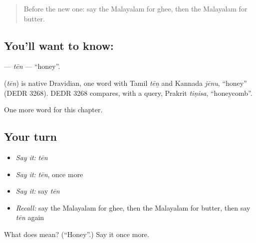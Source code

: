 \label{lesson:ML-C208-ten}



\begin{quote}
Before the new one: say the Malayalam for ghee, then the Malayalam for butter.
\end{quote}

\subsection*{You'll want to know: }
\textbf{} — \emph{tēn} — \textquotedblleft{}honey\textquotedblright{}.

\begin{cousinweb}
\textbf{} (\emph{tēn}) is native Dravidian, one word with Tamil \emph{tēṉ} and Kannada \emph{jēnu}, \textquotedblleft{}honey\textquotedblright{} (DEDR 3268). DEDR 3268 compares, with a query, Prakrit \emph{tiṇisa}, \textquotedblleft{}honeycomb\textquotedblright{}.
\end{cousinweb}

\begin{grammarlens}[title={What you've built}]
One more word for this chapter.
\end{grammarlens}

\subsection*{Your turn}
\begin{itemize}
\raggedright
  \item \emph{Say it:} \emph{tēn}
  \item \emph{Say it:} \emph{tēn}, once more
  \item \emph{Say it:} say \emph{tēn}
  \item \emph{Recall:} say the Malayalam for ghee, then the Malayalam for butter, then say \emph{tēn} again
\end{itemize}

\begin{tcolorbox}[breakable,colback=teal!4,colframe=teal!35!black,title={Before you move on}]
What does  mean? (\textquotedblleft{}Honey\textquotedblright{}.) Say it once more.
\end{tcolorbox}

